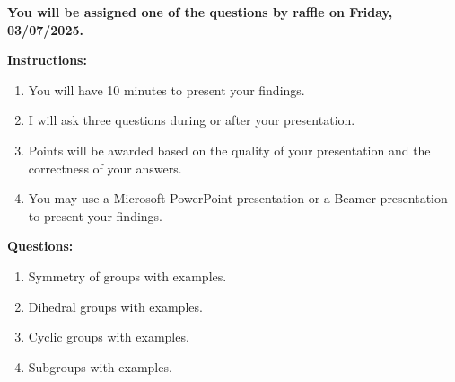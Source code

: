 \documentclass[11pt]{book}
\begin{document}
\thispagestyle{fancy}
\noindent	\textbf{You will be assigned one of the questions by raffle on Friday, 03/07/2025.}
\hfill
\vspace{0.3in}

\textbf{Instructions:}

\begin{enumerate}
    \item You will have 10 minutes to present your findings.
    \item I will ask three questions during or after your presentation.
    \item Points will be awarded based on the quality of your presentation and the correctness of your answers.
    \item You may use a Microsoft PowerPoint presentation or a Beamer presentation to present your findings.
\end{enumerate}

\textbf{Questions:}

\begin{enumerate}
    \item Symmetry of groups with examples.
    \item Dihedral groups with examples.
    \item Cyclic groups with examples.
    \item Subgroups with examples.
\end{enumerate}
\end{document}

